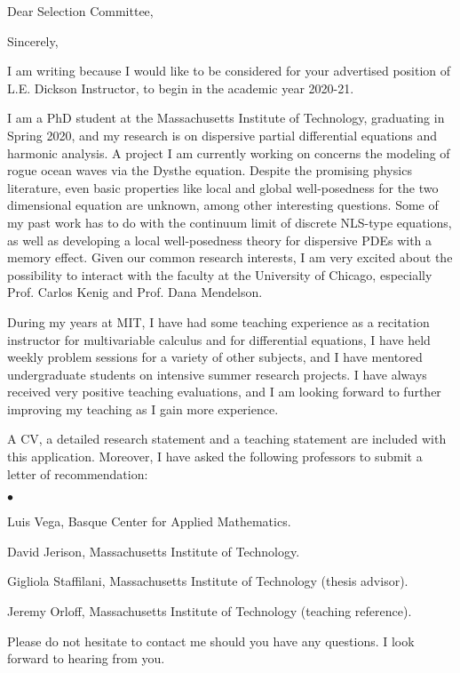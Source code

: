 %
%

\date{\today}
\opening{Dear Selection Committee,}
\closing{Sincerely,}
\makelettertitle

\justifying 

I am writing because I would like to be considered for your advertised position of L.E. Dickson Instructor, to begin in the academic year 2020-21.

I am a PhD student at the Massachusetts Institute of Technology, graduating in Spring 2020, and my research is on dispersive partial differential equations and harmonic analysis. A project I am currently working on concerns the modeling of rogue ocean waves via the Dysthe equation. Despite the promising physics literature, even basic properties like local and global well-posedness for the two dimensional equation are unknown, among other interesting questions. Some of my past work has to do with the continuum limit of discrete NLS-type equations, as well as developing a local well-posedness theory for dispersive PDEs with a memory effect. Given our common research interests, I am very excited about the possibility to interact with the faculty at the University of Chicago, especially Prof. Carlos Kenig and Prof. Dana Mendelson.

During my years at MIT, I have had some teaching experience as a recitation instructor for multivariable calculus and for differential equations, I have held weekly problem sessions for a variety of other subjects, and I have mentored undergraduate students on intensive summer research projects. I have always received very positive teaching evaluations, and I am looking forward to further improving my teaching as I gain more experience.

A CV, a detailed research statement and a teaching statement are included with this application. Moreover, I have asked the following professors to submit a letter of recommendation:
\begin{list}{$\bullet$}{}
\item Luis Vega, Basque Center for Applied Mathematics.
\item David Jerison, Massachusetts Institute of Technology.
\item Gigliola Staffilani, Massachusetts Institute of Technology (thesis advisor). 
\item Jeremy Orloff, Massachusetts Institute of Technology (teaching reference).
\end{list}

Please do not hesitate to contact me should you have any questions. I look forward to hearing from you.

\hspace{1.5cm}

\makeletterclosing

\clearpage

